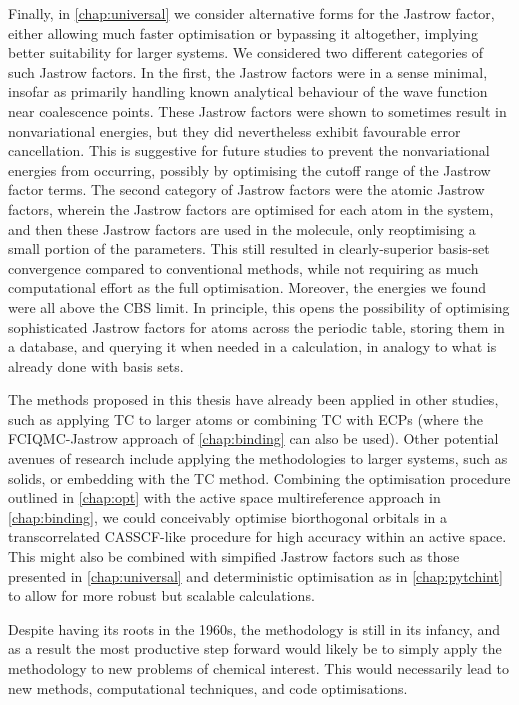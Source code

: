 Finally, in \autoref{chap:universal} we consider alternative forms for the Jastrow factor, either allowing much faster optimisation or bypassing it altogether, implying better suitability for larger systems. We considered two different categories of such Jastrow factors. In the first, the Jastrow factors were in a sense minimal, insofar as primarily handling known analytical behaviour of the wave function near coalescence points. These Jastrow factors were shown to sometimes result in nonvariational energies, but they did nevertheless exhibit favourable error cancellation. This is suggestive for future studies to prevent the nonvariational energies from occurring, possibly by optimising the cutoff range of the Jastrow factor terms. The second category of Jastrow factors were the atomic Jastrow factors, wherein the Jastrow factors are optimised for each atom in the system, and then these Jastrow factors are used in the molecule, only reoptimising a small portion of the parameters. This still resulted in clearly-superior basis-set convergence compared to conventional methods, while not requiring as much computational effort as the full optimisation. Moreover, the energies we found were all above the CBS limit. In principle, this opens the possibility of optimising sophisticated Jastrow factors for atoms across the periodic table, storing them in a database, and querying it when needed in a calculation, in analogy to what is already done with basis sets.

The methods proposed in this thesis have already been applied in other studies, such as applying TC to larger atoms\supercite{filip_2ndrow} or combining TC with \glspl{ECP} (where the FCIQMC-Jastrow approach of \autoref{chap:binding} can also be used).\supercite{simulaEcp} Other potential avenues of research include applying the methodologies to larger systems, such as solids, or embedding with the TC method. Combining the optimisation procedure outlined in \autoref{chap:opt} with the active space multireference approach in \autoref{chap:binding}, we could conceivably optimise biorthogonal orbitals in a transcorrelated CASSCF-like procedure for high accuracy within an active space. This might also be combined with simpified Jastrow factors such as those presented in \autoref{chap:universal} and deterministic optimisation as in \autoref{chap:pytchint} to allow for more robust but scalable calculations.

Despite having its roots in the 1960s, the methodology is still in its infancy, and as a result the most productive step forward would likely be to simply apply the methodology to new problems of chemical interest. This would necessarily lead to new methods, computational techniques, and code optimisations.
